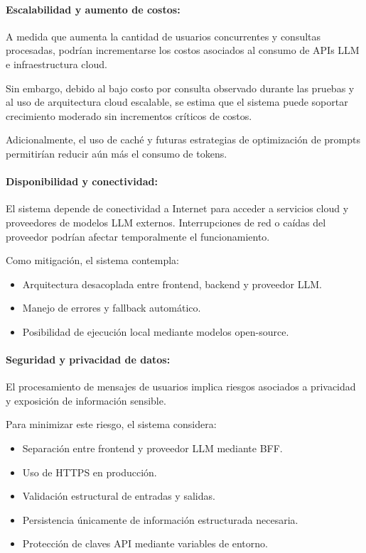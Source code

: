 \paragraph{Escalabilidad y aumento de costos:}

A medida que aumenta la cantidad de usuarios concurrentes y consultas procesadas, podrían incrementarse los costos asociados al consumo de APIs LLM e infraestructura cloud.

Sin embargo, debido al bajo costo por consulta observado durante las pruebas y al uso de arquitectura cloud escalable, se estima que el sistema puede soportar crecimiento moderado sin incrementos críticos de costos.

Adicionalmente, el uso de caché y futuras estrategias de optimización de prompts permitirían reducir aún más el consumo de tokens.

\paragraph{Disponibilidad y conectividad:}

El sistema depende de conectividad a Internet para acceder a servicios cloud y proveedores de modelos LLM externos. Interrupciones de red o caídas del proveedor podrían afectar temporalmente el funcionamiento.

Como mitigación, el sistema contempla:

\begin{itemize}
    \item Arquitectura desacoplada entre frontend, backend y proveedor LLM.
    \item Manejo de errores y fallback automático.
    \item Posibilidad de ejecución local mediante modelos open-source.
\end{itemize}

\paragraph{Seguridad y privacidad de datos:}

El procesamiento de mensajes de usuarios implica riesgos asociados a privacidad y exposición de información sensible.

Para minimizar este riesgo, el sistema considera:

\begin{itemize}
    \item Separación entre frontend y proveedor LLM mediante BFF.
    \item Uso de HTTPS en producción.
    \item Validación estructural de entradas y salidas.
    \item Persistencia únicamente de información estructurada necesaria.
    \item Protección de claves API mediante variables de entorno.
\end{itemize}

